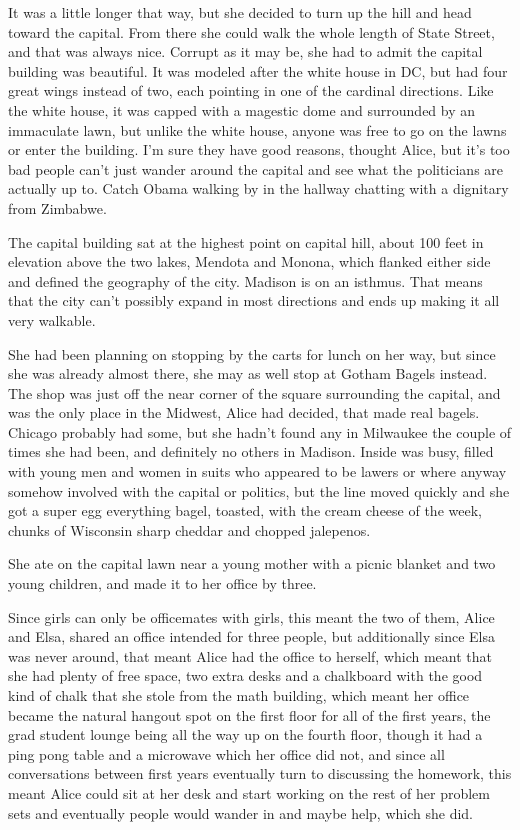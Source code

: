 \mypause

It was a little longer that way, but she decided to turn up the hill and head toward the capital. From there she could walk the whole length of State Street, and that was always nice. Corrupt as it may be, she had to admit the capital building was beautiful. It was modeled after the white house in DC, but had four great wings instead of two, each pointing in one of the cardinal directions. Like the white house, it was capped with a magestic dome and surrounded by an immaculate lawn, but unlike the white house, anyone was free to go on the lawns or enter the building. I'm sure they have good reasons, thought Alice, but it's too bad people can't just wander around the capital and see what the politicians are actually up to. Catch Obama walking by in the hallway chatting with a dignitary from Zimbabwe. 

The capital building sat at the highest point on capital hill, about 100 feet in elevation above the two lakes, Mendota and Monona, which flanked either side and defined the geography of the city. Madison is on an isthmus. That means that the city can't possibly expand in most directions and ends up making it all very walkable.

She had been planning on stopping by the carts for lunch on her way, but since she was already almost there, she may as well stop at Gotham Bagels instead. The shop was just off the near corner of the square surrounding the capital, and was the only place in the Midwest, Alice had decided, that made real bagels. Chicago probably had some, but she hadn't found any in Milwaukee the couple of times she had been, and definitely no others in Madison. Inside was busy, filled with young men and women in suits who appeared to be lawers or where anyway somehow involved with the capital or politics, but the line moved quickly and she got a super egg everything bagel, toasted, with the cream cheese of the week, chunks of Wisconsin sharp cheddar and chopped jalepenos. 

She ate on the capital lawn near a young mother with a picnic blanket and two young children, and made it to her office by three. 

\mypause

Since girls can only be officemates with girls, this meant the two of them, Alice and Elsa, shared an office intended for three people, but additionally since Elsa was never around, that meant Alice had the office to herself, which meant that she had plenty of free space, two extra desks and a chalkboard with the good kind of chalk that she stole from the math building, which meant her office became the natural hangout spot on the first floor for all of the first years, the grad student lounge being all the way up on the fourth floor, though it had a ping pong table and a microwave which her office did not, and since all conversations between first years eventually turn to discussing the homework, this meant Alice could sit at her desk and start working on the rest of her problem sets and eventually people would wander in and maybe help, which she did.

